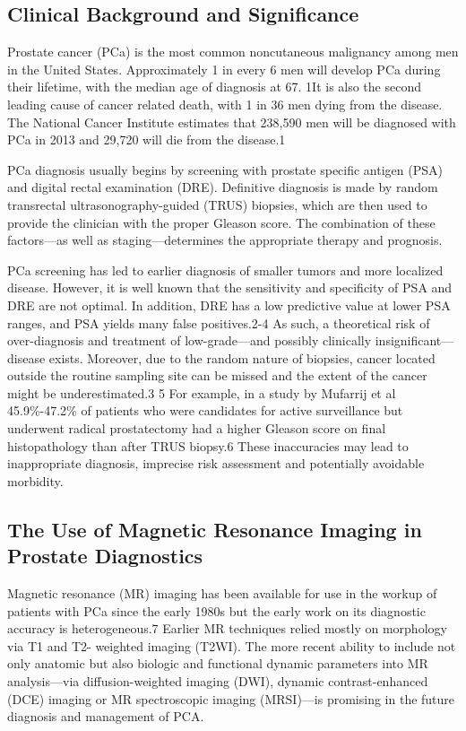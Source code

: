 \subsection{Clinical Background and Significance}
Prostate cancer (PCa) is the most common noncutaneous malignancy among men in the United States. Approximately 1 in every 6 men will develop PCa during their lifetime, with the median age of diagnosis at 67. 1It is also the second leading cause of cancer related death, with 1 in 36 men dying from the disease. The National Cancer Institute estimates that 238,590 men will be diagnosed with PCa in 2013 and 29,720 will die from the disease.1

PCa diagnosis usually begins by screening with prostate specific antigen (PSA) and digital rectal examination (DRE).  Definitive diagnosis is made by random transrectal ultrasonography-guided (TRUS) biopsies, which are then used to provide the clinician with the proper Gleason score. The combination of these factors—as well as staging—determines the appropriate therapy and prognosis. 

PCa screening has led to earlier diagnosis of smaller tumors and more localized disease.  However, it is well known that the sensitivity and specificity of PSA and DRE are not optimal. In addition, DRE has a low predictive value at lower PSA ranges, and PSA yields many false positives.2-4 As such, a theoretical risk of over-diagnosis and treatment of low-grade—and possibly clinically insignificant—disease exists. Moreover, due to the random nature of biopsies, cancer located outside the routine sampling site can be missed and the extent of the cancer might be underestimated.3 5 For example, in a study by Mufarrij et al 45.9\%-47.2\% of patients who were candidates for active surveillance but underwent radical prostatectomy had a higher Gleason score on final histopathology than after TRUS biopsy.6 These inaccuracies may lead to inappropriate diagnosis, imprecise risk assessment and potentially avoidable morbidity.

\subsection{The Use of Magnetic Resonance Imaging in Prostate Diagnostics}
Magnetic resonance (MR) imaging has been available for use in the workup of patients with PCa since the early 1980s but the early work on its diagnostic accuracy is heterogeneous.7 Earlier MR techniques relied mostly on morphology via T1 and T2- weighted imaging (T2WI). The more recent ability to include not only anatomic but also biologic and functional dynamic parameters into MR analysis—via diffusion-weighted imaging (DWI), dynamic contrast-enhanced (DCE) imaging or MR spectroscopic imaging (MRSI)—is promising in the future diagnosis and management of PCA.

